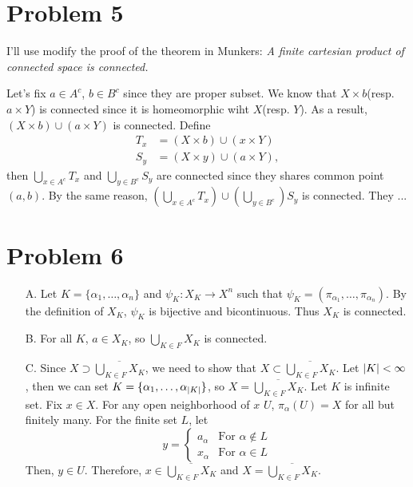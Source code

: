 \documentclass{article}
\DeclarePairedDelimiter\abs{\lvert}{\rvert}%
\begin{document}
\section*{Problem 5}
I'll use modify the proof of the theorem in Munkers: \textit{A finite cartesian product of connected space is connected.}

Let's fix $a\in A^c$, $b\in B^c$ since they are proper subset. We know that $X\times b$(resp. $a\times Y$) is connected since it is homeomorphic wiht $X$(resp. $Y$). As a result, $(X\times b) \cup (a\times Y)$ is connected. Define
\begin{equation*}
\begin{split}
T_x&=(X\times b)\cup (x\times Y) \\
S_y&=(X\times y)\cup (a\times Y),
\end{split}
\end{equation*}
then $\bigcup_{x\in A^c} T_x$ and $\bigcup_{y\in B^c} S_y$ are connected since they shares common point $(a,b)$. By the same reason, $\left(\bigcup_{x\in A^c} T_x\right) \cup \left(\bigcup_{y\in B^c}\right)S_y$ is connected. They ...
\section*{Problem 6}
\begin{enumerate}
\item[A.] Let $K=\{\alpha_1, \ldots, \alpha_n\}$ and $\psi_K:X_K\rightarrow X^{n}$ such that $\psi_K=(\pi_{\alpha_1}, \ldots, \pi_{\alpha_n})$. By the definition of $X_K$, $\psi_K$ is bijective and bicontinuous. Thus $X_K$ is connected.
\item[B.] For all $K$, $a\in X_K$, so $\bigcup_{K\in F}X_K$ is connected.
\item[C.] Since $X\supset\overline{\bigcup_{K\in F}X_K}$, we need to show that $X\subset \overline{\bigcup_{K\in F}X_K}$. Let $\abs{K}<\infty$, then we can set $K=\{\alpha_1, \ldots, \alpha_{\abs{K}}\}$, so $X=\overline{\bigcup_{K\in F}X_K}$. Let $K$ is infinite set. Fix $x\in X$. For any open neighborhood of $x$ $U$, $\pi_{\alpha}(U)=X$ for all but finitely many. For the finite set $L$, let
\begin{equation*}
y=\begin{cases}
a_{\alpha} & \text{For }\alpha\notin L \\
x_{\alpha} & \text{For }\alpha\in L
\end{cases}
\end{equation*}
Then, $y\in U$. Therefore, $x\in \overline{\bigcup_{K\in F}X_K}$ and $X=\overline{\bigcup_{K\in F}X_K}$.
\end{enumerate}
\end{document}

